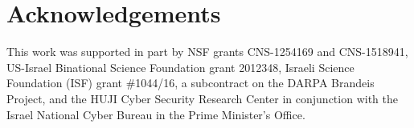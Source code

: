 \section{Acknowledgements}
This work was supported in part by NSF grants CNS-1254169 and CNS-1518941, US-Israel Binational Science Foundation grant 2012348, Israeli Science Foundation (ISF) grant \#1044/16, a subcontract on the DARPA Brandeis Project, and the HUJI Cyber Security Research Center in conjunction with the Israel National Cyber Bureau in the Prime Minister's Office.